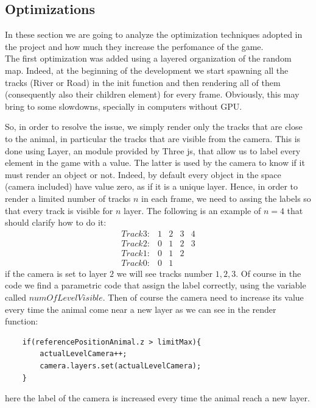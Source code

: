 \documentclass[a4paper, 11pt]{article}
\begin{document}
\subsection{Optimizations}
%
In these section we are going to analyze the optimization techniques adopted in the project and how much they increase the perfomance of the game. \\

The first optimization was added using a layered organization of the random map. Indeed, at the beginning of the development we start spawning all the tracks (River or Road) in the init function and then rendering all of them (consequently also their children element) for every frame. Obviously, this may bring to some slowdowns, specially in computers without GPU. 

So, in order to resolve the issue, we simply render only the tracks that are close to the animal, in particular the tracks that are visible from the camera. 
This is done using Layer, an module provided by Three js, that allow us to label every element in the game with a value. The latter is used by the camera to know if it must render an object or not. Indeed, by default every object in the space (camera included) have value zero, as if it is a unique layer. 
Hence, in order to render a limited number of tracks $n$ in each frame, we need to assing the labels so that every track is visible for $n$ layer. The following is an example of $n=4$ that should clarify how to do it:
\begin{equation}
    \begin{array}{lllll}
	Track3: & 1 & 2 & 3 & 4\\
	Track2: & 0 & 1 & 2 & 3\\
	Track1: & 0 & 1 & 2\\
	Track0: & 0 & 1
    \end{array}
\end{equation}
if the camera is set to layer $2$ we will see tracks number $1,2,3$.
Of course in the code we find a parametric code that assign the label correctly, using the variable called $numOfLevelVisible$.
Then of course the camera need to increase its value every time the animal come near a new layer as we can see in the render function:
\begin{lstlisting}
	if(referencePositionAnimal.z > limitMax){
		actualLevelCamera++;
      	camera.layers.set(actualLevelCamera);
	}
\end{lstlisting}
here the label of the camera is increased every time the animal reach a new layer. 
\end{document}
